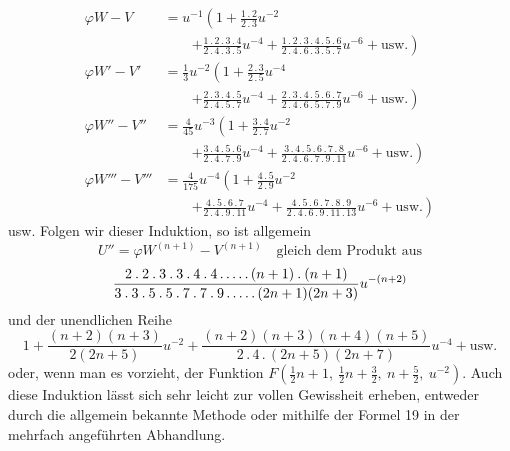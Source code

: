\[
\begin{aligned}
\varphi W-V&=u^{-1}\left(1+\frac{1\mathbin{.}2}{2\mathbin{.}3}u^{-2}\right.\\[3pt]&\qquad\left.+\frac{1\mathbin{.}2\mathbin{.}3\mathbin{.}4}{2\mathbin{.}4\mathbin{.}3\mathbin{.}5}u^{-4}+\frac{1\mathbin{.}2\mathbin{.}3\mathbin{.}4\mathbin{.}5\mathbin{.}6}{2\mathbin{.}4\mathbin{.}6\mathbin{.}3\mathbin{.}5\mathbin{.}7}u^{-6}+\text{usw.}\right)\\[4pt]
\varphi W'-V'&=\tfrac13u^{-2}\left(1+\frac{2\mathbin{.}3}{2\mathbin{.}5}u^{-4}\right.\\[3pt]&\qquad\left.+\frac{2\mathbin{.}3\mathbin{.}4\mathbin{.}5}{2\mathbin{.}4\mathbin{.}5\mathbin{.}7}u^{-4}+\frac{2\mathbin{.}3\mathbin{.}4\mathbin{.}5\mathbin{.}6\mathbin{.}7}{2\mathbin{.}4\mathbin{.}6\mathbin{.}5\mathbin{.}7\mathbin{.}9}u^{-6}+\text{usw.}\right)\\[4pt]
\varphi W''-V''&=\tfrac4{45}u^{-3}\left(1+\frac{3\mathbin{.}4}{2\mathbin{.}7}u^{-2}\right.\\[3pt]&\qquad\left.+\frac{3\mathbin{.}4\mathbin{.}5\mathbin{.}6}{2\mathbin{.}4\mathbin{.}7\mathbin{.}9}u^{-4}+\frac{3\mathbin{.}4\mathbin{.}5\mathbin{.}6\mathbin{.}7\mathbin{.}8}{2\mathbin{.}4\mathbin{.}6\mathbin{.}7\mathbin{.}9\mathbin{.}11}u^{-6}+\text{usw.}\right)\\[4pt]
\varphi W'''-V'''&=\tfrac4{175}u^{-4}\left(1+\frac{4\mathbin{.}5}{2\mathbin{.}9}u^{-2}\right.\\[3pt]&\qquad\left.+\frac{4\mathbin{.}5\mathbin{.}6\mathbin{.}7}{2\mathbin{.}4\mathbin{.}9\mathbin{.}11}u^{-4}+\frac{4\mathbin{.}5\mathbin{.}6\mathbin{.}7\mathbin{.}8\mathbin{.}9}{2\mathbin{.}4\mathbin{.}6\mathbin{.}9\mathbin{.}11\mathbin{.}13}u^{-6}+\text{usw.}\right)
\end{aligned}
\]
usw. Folgen wir dieser Induktion, so ist allgemein
\[
U''=\varphi W^{(n+1)}-V^{(n+1)}\quad\text{gleich dem Produkt aus}
\]
\[
\frac{2\mathbin{.}2\mathbin{.}3\mathbin{.}3\mathbin{.}4\mathbin{.}4\mathinner{.\,.\,.\,.\,.}(n+1)\mathbin{.}(n+1)}{3\mathbin{.}3\mathbin{.}5\mathbin{.}5\mathbin{.}7\mathbin{.}7\mathbin{.}9\mathinner{.\,.\,.\,.\,.}(2n+1)(2n+3)}u^{-(n+2)}
\]
und der unendlichen Reihe
\[
1+\frac{(n+2)(n+3)}{2(2n+5)}u^{-2}+\frac{(n+2)(n+3)(n+4)(n+5)}{2\mathbin{.}4\mathbin{.}(2n+5)(2n+7)}u^{-4}+\text{usw.}
\]
oder, wenn man es vorzieht, der Funktion $F(\frac12n+1,\ \frac12n+\frac32,\ n+\frac52,\ u^{-2})$. Auch diese Induktion lässt sich sehr leicht zur vollen Gewissheit erheben, entweder durch die allgemein bekannte Methode oder mithilfe der Formel 19 in der mehrfach angeführten Abhandlung.

